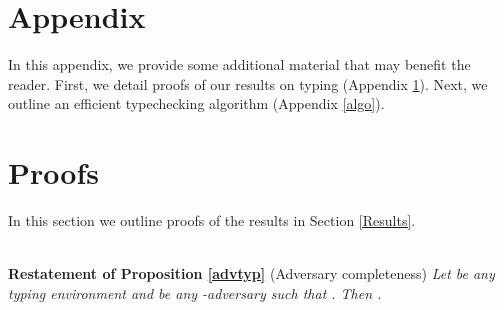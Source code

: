 \documentclass{sigplanconf}
\begin{document}
\section*{Appendix}
In this appendix, we provide some additional material that may benefit the reader. First, we detail proofs of our results on typing (Appendix \ref{proofs}). Next, we outline an efficient typechecking algorithm (Appendix \ref{algo}).

\section{Proofs}\label{proofs}
\noindent
In this section we outline proofs of the results in Section \ref{Results}. 

\\
{\bf Restatement of Proposition \ref{advtyp}} (Adversary completeness) {\em Let
   be any typing environment and  be any -adversary  such that .
Then .
}
\end{document}
